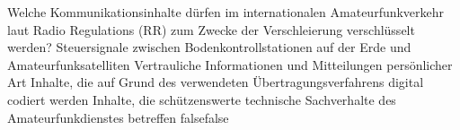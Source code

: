     {Welche Kommunikationsinhalte dürfen im internationalen Amateurfunkverkehr laut Radio Regulations (RR) zum Zwecke der Verschleierung verschlüsselt werden?}
    {Steuersignale zwischen Bodenkontrollstationen auf der Erde und Amateurfunksatelliten}
    {Vertrauliche Informationen und Mitteilungen persönlicher Art}
    {Inhalte, die auf Grund des verwendeten Übertragungsverfahrens digital codiert werden}
    {Inhalte, die schützenswerte technische Sachverhalte des Amateurfunkdienstes betreffen}
    {false}{false}